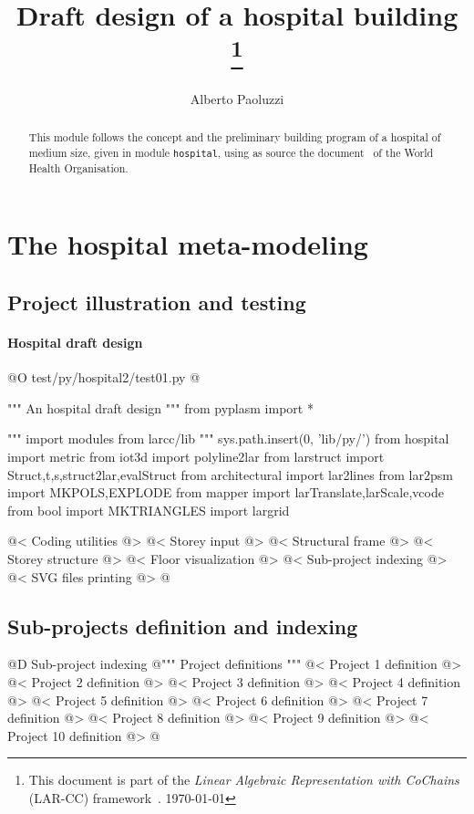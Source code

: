 \documentclass[11pt,oneside]{article}    %
\title{Draft design of a hospital building
\footnote{This document is part of the \emph{Linear Algebraic Representation with CoChains} (LAR-CC) framework~\cite{cclar-proj:2013:00}. \today}
}
\author{Alberto Paoluzzi}
\begin{document}
\maketitle
\tableofcontents

\begin{abstract}
This module follows the concept and the preliminary building program of a hospital of medium size, given in module \texttt{hospital}, using as source the document~\cite{who:2013} of the World Health Organisation. 
\end{abstract}


\section{The  hospital meta-modeling}

\subsection{Project illustration and testing}

\paragraph{Hospital draft design}
@O test/py/hospital2/test01.py
@{""" An hospital draft design """
from pyplasm import *

""" import modules from larcc/lib """
sys.path.insert(0, 'lib/py/')
from hospital import metric
from iot3d import polyline2lar
from larstruct import Struct,t,s,struct2lar,evalStruct
from architectural import lar2lines
from lar2psm import MKPOLS,EXPLODE
from mapper import larTranslate,larScale,vcode
from bool import MKTRIANGLES
import largrid
    
@< Coding utilities @>
@< Storey input @>
@< Structural frame @>
@< Storey structure @>
@< Floor visualization @>
@< Sub-project indexing @>
@< SVG files printing @>
@}

\subsection{Sub-projects definition and indexing}

@D Sub-project indexing
@{""" Project definitions """
@< Project 1 definition @>
@< Project 2 definition @>
@< Project 3 definition @>
@< Project 4 definition @>
@< Project 5 definition @>
@< Project 6 definition @>
@< Project 7 definition @>
@< Project 8 definition @>
@< Project 9 definition @>
@< Project 10 definition @>
@}
\end{document}
